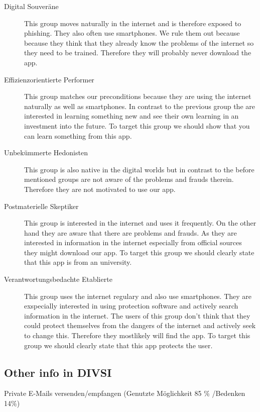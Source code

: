 \begin{description}
\item[Digital Souveräne] This group moves naturally in the internet and is therefore exposed to phishing. They also often use smartphones. We rule them out because because they think that they already know the problems of the internet so they need to be trained. Therefore they will probably never download the app.
\item[Effizienzorientierte Performer] This group matches our preconditions because they are using the internet naturally as well as smartphones. In contrast to the previous group the are interested in learning something new and see their own learning in an investment into the future. To target this group we should show that you can learn something from this app.
\item[Unbekümmerte Hedonisten] This group is also native in the digital worlds but in contrast to the before mentioned groups are not aware of the problems and frauds therein. Therefore they are not motivated to use our app.
\item[Postmaterielle Skeptiker] This group is interested in the internet and uses it frequently. On the other hand they are aware that there are problems and frauds. As they are interested in information in the internet especially from official sources they might download our app. To target this group we should clearly state that this app is from an university.
\item[Verantwortungsbedachte Etablierte] This group uses the internet regulary and also use smartphones. They are exspecially interested in using protection software and actively search information in the internet. The users of this group don't think that they could protect themselves from the dangers of the internet and actively seek to change this. Therefore they mostlikely will find the app. To target this group we should clearly state that this app protects the user.
\end{description}

\subsection{Other info in DIVSI}
Private E-Mails versenden/empfangen (Genutzte Möglichkeit 85 \% \slash Bedenken 14\%)
